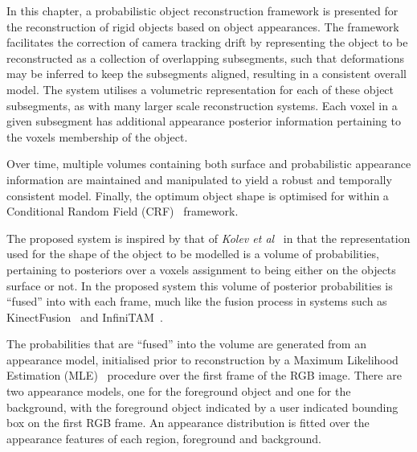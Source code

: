 In this chapter, a probabilistic object reconstruction framework is presented
for the reconstruction of rigid objects based on object appearances.
The framework facilitates the correction of camera tracking drift by
representing the object to be reconstructed as a collection of overlapping
subsegments, such that deformations may be inferred to keep the subsegments
aligned, resulting in a consistent overall model. The system utilises a
volumetric representation for each of these object subsegments, as with many
larger scale reconstruction systems. Each voxel in a given subsegment has
additional appearance posterior information pertaining to the voxels membership
of the object.

Over time, multiple volumes containing both surface and probabilistic appearance
information are maintained and manipulated to yield a robust and temporally
consistent model. Finally, the optimum object shape is optimised for within a 
Conditional Random Field (CRF)~\cite{BishopPRML} framework.

The proposed system is inspired by that of \textit{Kolev et al}~\cite{Kolev2006} 
in that the representation used for the shape of the object to be modelled is a 
volume of probabilities, pertaining to posteriors over a voxels assignment to 
being either on the objects surface or not. In the proposed system this volume 
of posterior probabilities is ``fused'' into with each frame, much like the 
fusion process in systems such as KinectFusion~\cite{Newcombe2011} and 
InfiniTAM~\cite{Prisacariu2014}.

The probabilities that are ``fused'' into the volume are generated from an
appearance model, initialised prior to reconstruction by a Maximum Likelihood 
Estimation (MLE)~\cite{BishopPRML} procedure over the first frame of the RGB image. 
There are two appearance models, one for the foreground object and one for the 
background, with the foreground object indicated by a user indicated bounding box 
on the first RGB frame. An appearance distribution is fitted over the appearance 
features of each region, foreground and background. 

